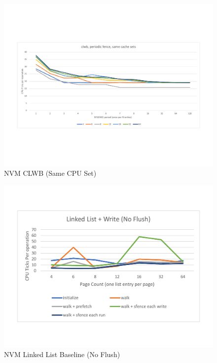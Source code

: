 \begin{figure}
    \centering
    \caption{NVM CLWB (Same CPU Set)}\label{micro:clwb:same}
    \includegraphics[scale=0.35]{micro/nvm-clwb-periodic-same.pdf}
\end{figure}

\begin{figure}
    \centering
    \caption{NVM Linked List Baseline (No Flush)}\label{micro:llbaseline:noflush}
    \includegraphics[scale=0.35]{micro/nvm-linked-list-baseline-no-flush.pdf}
\end{figure}

